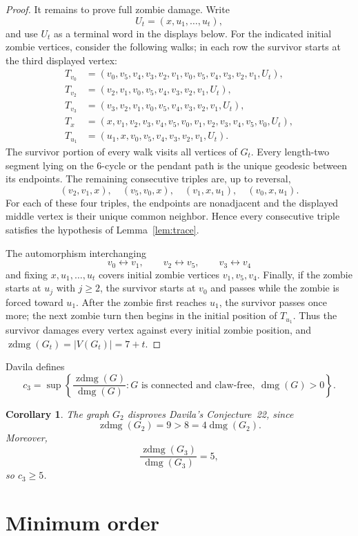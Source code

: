 \documentclass[11pt]{amsart}
\newtheorem{corollary}[theorem]{Corollary}
\DeclareMathOperator{\dmg}{dmg}
\DeclareMathOperator{\zdmg}{zdmg}
\begin{document}
\begin{proof}
It remains to prove full zombie damage. Write
\[
  U_t=(x,u_1,\ldots,u_t),
\]
and use $U_t$ as a terminal word in the displays below. For the indicated
initial zombie vertices, consider the following walks; in each row the
survivor starts at the third displayed vertex:
\begin{align*}
T_{v_0}&=(v_0,v_5,v_4,v_3,v_2,v_1,
          v_0,v_5,v_4,v_3,v_2,v_1,U_t),\\
T_{v_2}&=(v_2,v_1,v_0,v_5,v_4,v_3,v_2,v_1,U_t),\\
T_{v_3}&=(v_3,v_2,v_1,v_0,v_5,v_4,v_3,v_2,v_1,U_t),\\
T_x&=(x,v_1,v_2,v_3,v_4,v_5,v_0,
      v_1,v_2,v_3,v_4,v_5,v_0,U_t),\\
T_{u_1}&=(u_1,x,v_0,v_5,v_4,v_3,v_2,v_1,U_t).
\end{align*}
The survivor portion of every walk visits all vertices of $G_t$. Every
length-two segment lying on the $6$-cycle or the pendant path is the unique
geodesic between its endpoints. The remaining consecutive triples are, up
to reversal,
\[
  (v_2,v_1,x),\quad (v_5,v_0,x),\quad
  (v_1,x,u_1),\quad (v_0,x,u_1).
\]
For each of these four triples, the endpoints are nonadjacent and the
displayed middle vertex is their unique common neighbor. Hence every
consecutive triple satisfies the hypothesis of Lemma~\ref{lem:trace}.

The automorphism interchanging
\[
  v_0\leftrightarrow v_1,\qquad
  v_2\leftrightarrow v_5,\qquad
  v_3\leftrightarrow v_4
\]
and fixing $x,u_1,\ldots,u_t$ covers initial zombie vertices
$v_1,v_5,v_4$. Finally, if the zombie starts at $u_j$ with $j\geq2$, the
survivor starts at $v_0$ and passes while the zombie is forced toward $u_1$.
After the zombie first reaches $u_1$, the survivor passes once more; the next
zombie turn then begins in the initial position of $T_{u_1}$. Thus the
survivor damages every vertex against every initial zombie position, and
$\zdmg(G_t)=|V(G_t)|=7+t$.
\end{proof}

Davila defines
\[
  c_3=\sup\left\{
  \frac{\zdmg(G)}{\dmg(G)}:
  G\text{ is connected and claw-free},\ \dmg(G)>0
  \right\}.
\]

\begin{corollary}\label{cor:main}
The graph $G_2$ disproves Davila's Conjecture~22, since
\[
  \zdmg(G_2)=9>8=4\dmg(G_2).
\]
Moreover,
\[
  \frac{\zdmg(G_3)}{\dmg(G_3)}=5,
\]
so $c_3\geq5$.
\end{corollary}

\section{Minimum order}
\end{document}
